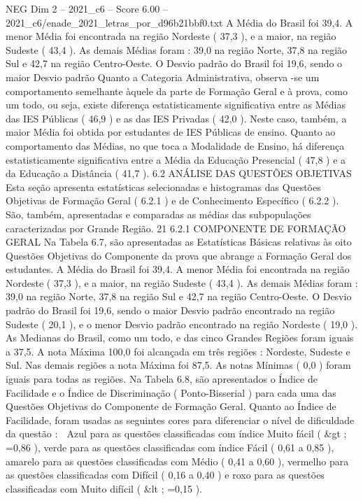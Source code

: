 \begin{textsample}{NEG Dim 2 – 2021\_c6 – Score 6.00 – 2021\_c6/enade\_2021\_letras\_por\_d96b21bbf0.txt}
A Média do Brasil foi 39,4.
A menor Média foi encontrada na região Nordeste ( 37,3 ), e a maior, na região Sudeste ( 43,4 ).
As demais Médias foram : 39,0 na região Norte, 37,8 na região Sul e 42,7 na região Centro-Oeste.
O Desvio padrão do Brasil foi 19,6, sendo o maior Desvio padrão Quanto a Categoria Administrativa, observa -se um comportamento semelhante àquele da parte de Formação Geral e à prova, como um todo, ou seja, existe diferença estatisticamente significativa entre as Médias das IES Públicas ( 46,9 ) e as das IES Privadas ( 42,0 ).
Neste caso, também, a maior Média foi obtida por estudantes de IES Públicas de ensino.
Quanto ao comportamento das Médias, no que toca a Modalidade de Ensino, há diferença estatisticamente significativa entre a Média da Educação Presencial ( 47,8 ) e a da Educação a Distância ( 41,7 ). 6.2 ANÁLISE DAS QUESTÕES OBJETIVAS Esta seção apresenta estatísticas selecionadas e histogramas das Questões Objetivas de Formação Geral ( 6.2.1 ) e de Conhecimento Específico ( 6.2.2 ).
São, também, apresentadas e comparadas as médias das subpopulações caracterizadas por Grande Região. 21 6.2.1 COMPONENTE DE FORMAÇÃO GERAL Na Tabela 6.7, são apresentadas as Estatísticas Básicas relativas às oito Questões Objetivas do Componente da prova que abrange a Formação Geral dos estudantes.
A Média do Brasil foi 39,4.
A menor Média foi encontrada na região Nordeste ( 37,3 ), e a maior, na região Sudeste ( 43,4 ).
As demais Médias foram : 39,0 na região Norte, 37,8 na região Sul e 42,7 na região Centro-Oeste.
O Desvio padrão do Brasil foi 19,6, sendo o maior Desvio padrão encontrado na região Sudeste ( 20,1 ), e o menor Desvio padrão encontrado na região Nordeste ( 19,0 ).
As Medianas do Brasil, como um todo, e das cinco Grandes Regiões foram iguais a 37,5.
A nota Máxima 100,0 foi alcançada em três regiões : Nordeste, Sudeste e Sul.
Nas demais regiões a nota Máxima foi 87,5.
As notas Mínimas ( 0,0 ) foram iguais para todas as regiões.
Na Tabela 6.8, são apresentados o Índice de Facilidade e o Índice de Discriminação ( Ponto-Bisserial ) para cada uma das Questões Objetivas do Componente de Formação Geral.
Quanto ao Índice de Facilidade, foram usadas as seguintes cores para diferenciar o nível de dificuldade da questão :  Azul para as questões classificadas com índice Muito fácil ( \&gt ; =0,86 ), verde para as questões classificadas com índice Fácil ( 0,61 a 0,85 ), amarelo para as questões classificadas com Médio ( 0,41 a 0,60 ), vermelho para as questões classificadas com Difícil ( 0,16 a 0,40 ) e roxo para as questões classificadas com Muito difícil ( \&lt ; =0,15 ).

\end{textsample}
